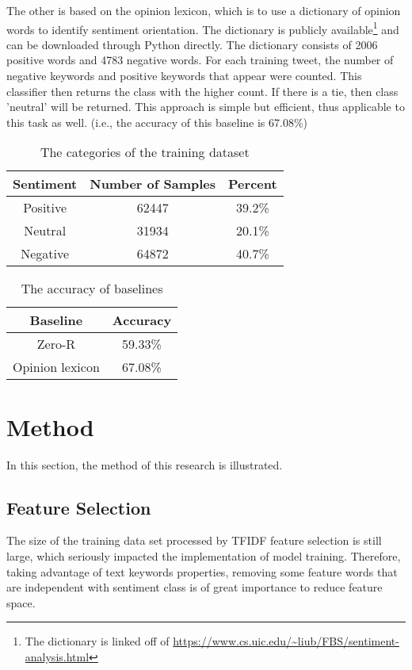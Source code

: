 \documentclass[11pt]{article}
\begin{document}
The other is based on the opinion lexicon, which is to use a dictionary of opinion words to identify sentiment orientation. The dictionary is publicly available\footnote{The dictionary is linked off of \url{https://www.cs.uic.edu/~liub/FBS/sentiment-analysis.html}} and can be downloaded through Python directly. The dictionary consists of 2006 positive words and 4783 negative words. For each training tweet, the number of negative keywords and positive keywords that appear were counted. This classifier then returns the class with the higher count. If there is a tie, then class 'neutral' will be returned. This approach is simple but efficient, thus applicable to this task as well. (i.e., the accuracy of this baseline is 67.08\%)
\begin{table}[h]
 \begin{center}
\begin{tabular}{|c|c|c|}
      \hline
      Sentiment & Number of Samples&Percent\\
      \hline\hline
      Positive & 62447&39.2\%\\
      Neutral & 31934&20.1\%\\
      Negative & 64872&40.7\%\\
      \hline

\end{tabular}
\caption{ The categories of the training dataset}\label{table1}
 \end{center}
\end{table}
\begin{table}[h]
 \begin{center}
\begin{tabular}{|c|c|}
      \hline
      Baseline & Accuracy\\
      \hline\hline
      Zero-R &59.33\%\\
      Opinion lexicon & 67.08\%\\
      \hline

\end{tabular}
\caption{The accuracy of baselines}\label{baselines}
 \end{center}
\end{table}

\section{Method}
In this section, the method of this research is illustrated. 
\subsection{Feature Selection}
The size of the training data set processed by TFIDF feature selection is still large, which seriously impacted the implementation of model training. Therefore, taking advantage of text keywords properties, removing some feature words that are independent with sentiment class is of great importance to reduce feature space.
\end{document}
